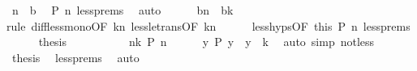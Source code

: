 \begin{isabellebody}
\ {\isachardoublequoteopen}n\ {\isasymle}\ b{\isachardoublequoteclose}\ \isamarkupfalse%
\ {\isacartoucheopen}P\ n{\isacartoucheclose}\ less{\isachardot}{\kern0pt}prems{\isacharparenleft}{\kern0pt}{}{\isacharparenright}{\kern0pt}\ \isamarkupfalse%
\ auto\isanewline
\ \ \ \ \isamarkupfalse%
\ {\isachardoublequoteopen}b{\isacharminus}{\kern0pt}n\ {\isacharless}{\kern0pt}\ b{\isacharminus}{\kern0pt}k{\isachardoublequoteclose}\isanewline
\ \ \ \ \ \ \isamarkupfalse%
{\isacharparenleft}{\kern0pt}rule\ diff{\isacharunderscore}{\kern0pt}less{\isacharunderscore}{\kern0pt}mono{}{\isacharbrackleft}{\kern0pt}OF\ {\isacartoucheopen}k{\isacharless}{\kern0pt}n{\isacartoucheclose}\ less{\isacharunderscore}{\kern0pt}le{\isacharunderscore}{\kern0pt}trans{\isacharbrackleft}{\kern0pt}OF\ {\isacartoucheopen}k{\isacharless}{\kern0pt}n{\isacartoucheclose}{\isacharbrackright}{\kern0pt}{\isacharbrackright}{\kern0pt}{\isacharparenright}{\kern0pt}\isanewline
\ \ \ \ \isamarkupfalse%
\ less{\isachardot}{\kern0pt}hyps{\isacharbrackleft}{\kern0pt}OF\ this\ {\isacartoucheopen}P\ n{\isacartoucheclose}\ less{\isachardot}{\kern0pt}prems{\isacharparenleft}{\kern0pt}{}{\isacharparenright}{\kern0pt}{\isacharbrackright}{\kern0pt}\isanewline
\ \ \ \ \isamarkupfalse%
\ {\isacharquery}{\kern0pt}thesis\ \isacommand{{\isachardot}{\kern0pt}}\isamarkupfalse%
\isanewline
\ \ \isamarkupfalse%
\isanewline
\ \ \ \ \isamarkupfalse%
\ {\isachardoublequoteopen}{\isasymnot}\ {\isacharparenleft}{\kern0pt}{\isasymexists}n{\isachargreater}{\kern0pt}k{\isachardot}{\kern0pt}\ P\ n{\isacharparenright}{\kern0pt}{\isachardoublequoteclose}\isanewline
\ \ \ \ \isamarkupfalse%
\ {\isachardoublequoteopen}{\isasymforall}y{\isachardot}{\kern0pt}\ P\ y\ {\isasymlongrightarrow}\ y\ {\isasymle}\ k{\isachardoublequoteclose}\ \isamarkupfalse%
\ {\isacharparenleft}{\kern0pt}auto\ simp{\isacharcolon}{\kern0pt}\ not{\isacharunderscore}{\kern0pt}less{\isacharparenright}{\kern0pt}\isanewline
\ \ \ \ \isamarkupfalse%
\ {\isacharquery}{\kern0pt}thesis\ \isamarkupfalse%
\ less{\isachardot}{\kern0pt}prems{\isacharparenleft}{\kern0pt}{}{\isacharparenright}{\kern0pt}\ \isamarkupfalse%
\ auto\isanewline
\ \ \isamarkupfalse%
\isanewline
{}\isamarkupfalse%
%
\endisatagproof
{\isafoldproof}%
%
\isadelimproof
\isanewline
%
\endisadelimproof
\isanewline

\end{isabellebody}
